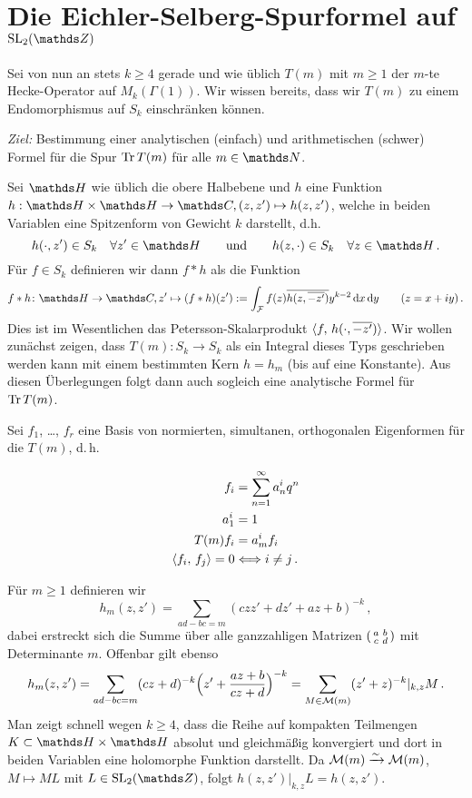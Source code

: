 \chapter{Die Eichler-Selberg-Spurformel auf \texorpdfstring{$\SL_2(\ZZ)$}{SL_2(Z)}}

Sei von nun an stets $k \geq 4$ gerade und wie üblich $T(m)$ mit $m \geq 1$ der $m$-te Hecke-Operator auf $M_k (\Gamma(1))$. Wir wissen bereits, dass wir $T(m)$ zu einem Endomorphismus auf $S_k$ einschränken können.

\emph{Ziel:} Bestimmung einer analytischen (einfach) und arithmetischen (schwer) Formel für die Spur $\operatorname{Tr} T(m)$ für alle $m \in \NN$.

Sei $\HH$ wie üblich die obere Halbebene und $h$ eine Funktion $h: \HH \times \HH \to \CC, (z, z') \mapsto h(z, z')$, welche in beiden Variablen eine Spitzenform von Gewicht $k$ darstellt, d.h. 
\[
	h(\cdot, z') \in S_k \quad \forall z' \in \HH \qquad \text{und} \qquad h(z, \cdot) \in S_k \quad \forall z \in \HH
	\,.
\]
Für $f \in S_k$ definieren wir dann $f \ast h$ als die Funktion
\begin{equation}\label{eq:faltungskern}
	f \ast h \colon \HH \to \CC, z' \mapsto (f \ast h)(z') := \int_{\mathcal F} f(z) \conj{ h(z, \conj{-z'})} y^{k-2} \opd x \opd y \qquad (z = x + iy)
	\,.
\end{equation}
Dies ist im Wesentlichen das Petersson-Skalarprodukt $\scalarprd f{h(\cdot, \conj{-z'})}$. Wir wollen zunächst zeigen, dass $T(m) \colon S_k \to S_k$ als ein Integral dieses Typs geschrieben werden kann mit einem bestimmten Kern $h = h_m$ (bis auf eine Konstante). Aus diesen Überlegungen folgt dann auch sogleich eine analytische Formel für $\operatorname{Tr} T(m)$.

Sei $f_1$, \ldots, $f_r$ eine Basis von normierten, simultanen, orthogonalen Eigenformen für die $T(m)$, d.\,h.

\begin{align*}
f_i &= \sum_{n=1}^\infty a_n^i q^n \\
a_1^i &= 1 \\
T(m)f_i &= a_m^if_i \\
\scalarprd {f_i}{f_j} = 0 &\Rla i \not= j
\,.
\end{align*}


Für $m \geq 1$ definieren wir
\[
h_m(z, z') = \sum_{ad-bc=m} (czz' + dz' + az + b)^{-k}
\,,
\]
dabei erstreckt sich die Summe über alle ganzzahligen Matrizen $\abcd$ mit Determinante $m$.
Offenbar gilt ebenso
\[
h_m(z,z') = \sum_{ad-bc=m} (cz+d)^{-k} \Bigl(z' + \frac{az+b}{cz+d}\Bigr)^{-k}
= \sum_{M \in \mathcal{M}(m)} (z'+z)^{-k}|_{k,z} M
\,.
\]
Man zeigt schnell wegen $k \geq 4$, dass die Reihe auf kompakten Teilmengen $K \subset \HH \times \HH$ absolut und gleichmäßig konvergiert und dort in beiden Variablen eine holomorphe Funktion darstellt.
Da $\mathcal{M}(m) \xrightarrow{\sim} \mathcal{M}(m)$, $M \mapsto ML$ mit $L \in \SL_2(\ZZ)$,
folgt $h(z,z')|_{k,z} L = h(z, z')$.

